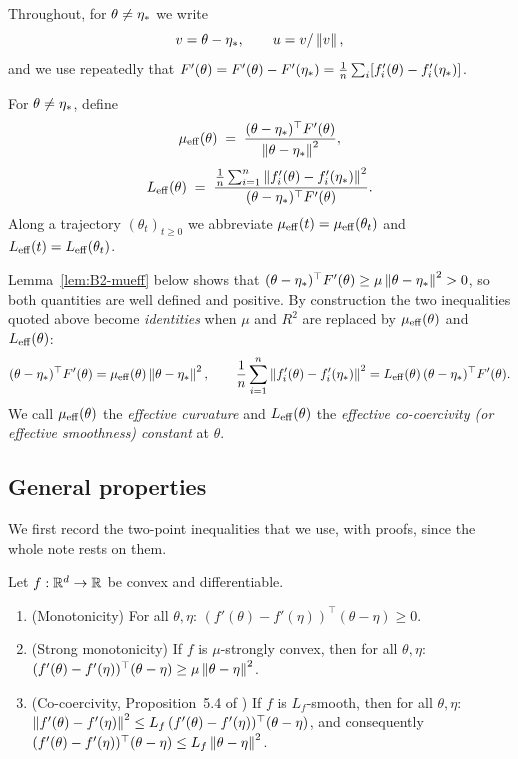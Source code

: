 Throughout, for $\theta\neq\eta_\ast$ we write
\[
v=\theta-\eta_\ast,\qquad u=v/\left\|v\right\|,
\]
and we use repeatedly that $F'(\theta)=F'(\theta)-F'(\eta_\ast)=\frac1n\sum_i[f'_i(\theta)-f'_i(\eta_\ast)]$.

\begin{definition}\label{def:B2-eff}
For $\theta\neq\eta_\ast$, define
\begin{equation}\label{eq:B2-def-mueff}
\mu_{\mathrm{eff}}(\theta)\;=\;\frac{(\theta-\eta_\ast)^\top F'(\theta)}{\left\|\theta-\eta_\ast\right\|^2},
\end{equation}
\begin{equation}\label{eq:B2-def-Leff}
L_{\mathrm{eff}}(\theta)\;=\;\frac{\frac1n\sum_{i=1}^n\left\|f'_i(\theta)-f'_i(\eta_\ast)\right\|^2}{(\theta-\eta_\ast)^\top F'(\theta)}.
\end{equation}
Along a trajectory $(\theta_t)_{t\ge0}$ we abbreviate $\mu_{\mathrm{eff}}(t)=\mu_{\mathrm{eff}}(\theta_t)$ and $L_{\mathrm{eff}}(t)=L_{\mathrm{eff}}(\theta_t)$.
\end{definition}

Lemma~\ref{lem:B2-mueff} below shows that $(\theta-\eta_\ast)^\top F'(\theta)\ge\mu\left\|\theta-\eta_\ast\right\|^2>0$,
so both quantities are well defined and positive. By construction the two inequalities quoted above
become \emph{identities} when $\mu$ and $R^2$ are replaced by $\mu_{\mathrm{eff}}(\theta)$ and $L_{\mathrm{eff}}(\theta)$:
\[
(\theta-\eta_\ast)^\top F'(\theta)=\mu_{\mathrm{eff}}(\theta)\left\|\theta-\eta_\ast\right\|^2,\qquad
\frac1n\sum_{i=1}^n\left\|f'_i(\theta)-f'_i(\eta_\ast)\right\|^2=L_{\mathrm{eff}}(\theta)\,(\theta-\eta_\ast)^\top F'(\theta).
\]
We call $\mu_{\mathrm{eff}}(\theta)$ the \emph{effective curvature} and $L_{\mathrm{eff}}(\theta)$ the \emph{effective
co-coercivity (or effective smoothness) constant} at $\theta$.

\subsection{General properties}\label{sec:B2-general}

We first record the two-point inequalities that we use, with proofs, since the whole note rests on them.

\begin{lemma}\label{lem:B2-twopoint}
Let $f:\mathbb{R}^d\to\mathbb{R}$ be convex and differentiable.
\begin{enumerate}[label=(\alph*)]
\item (Monotonicity) For all $\theta,\eta$: $(f'(\theta)-f'(\eta))^\top(\theta-\eta)\ge0$.
\item (Strong monotonicity) If $f$ is $\mu$-strongly convex, then for all $\theta,\eta$:
$(f'(\theta)-f'(\eta))^\top(\theta-\eta)\ge\mu\left\|\theta-\eta\right\|^2$.
\item (Co-coercivity, Proposition~5.4 of \cite{bach2024learning}) If $f$ is $L_f$-smooth, then for all $\theta,\eta$:
$\left\|f'(\theta)-f'(\eta)\right\|^2\le L_f\,(f'(\theta)-f'(\eta))^\top(\theta-\eta)$, and consequently
$(f'(\theta)-f'(\eta))^\top(\theta-\eta)\le L_f\left\|\theta-\eta\right\|^2$.
\end{enumerate}
\end{lemma}


